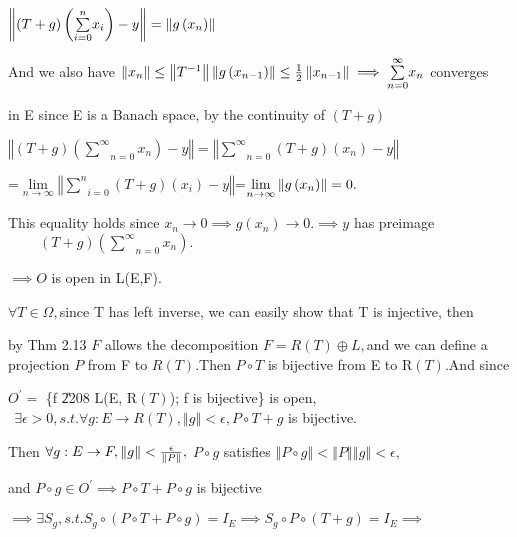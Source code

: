 \documentclass{article}
\begin{document}
\bigskip $\left\Vert \left( T+g\right) \left( \underset{i=0}{\overset{n}{%
\sum }}x_{i}\right) -y\right\Vert =\left\Vert g\left( x_{n}\right)
\right\Vert $

And we also have $\left\Vert x_{n}\right\Vert \leq \left\Vert
T^{-1}\right\Vert \left\Vert g\left( x_{n-1}\right) \right\Vert \leq \frac{1%
}{2}\left\Vert x_{n-1}\right\Vert \implies \underset{n=0}{\overset{\infty }{%
\sum }}x_{n}$ converges 

in E since E is a Banach space, by the continuity of $\left( T+g\right) $

$\left\Vert \left( T+g\right) \left( \underset{n=0}{\overset{\infty }{\sum }}%
x_{n}\right) -y\right\Vert =\left\Vert \underset{n=0}{\overset{\infty }{\sum 
}}\left( T+g\right) \left( x_{n}\right) -y\right\Vert $

=$\underset{n\rightarrow \infty }{\lim }\left\Vert \underset{i=0}{\overset{n}%
{\sum }}\left( T+g\right) \left( x_{i}\right) -y\right\Vert $=$\underset{%
n\rightarrow \infty }{\lim }\left\Vert g\left( x_{n}\right) \right\Vert =0.$

This equality holds since $x_{n}\rightarrow 0\implies g\left( x_{n}\right)
\rightarrow 0.\implies y$ has preimage $\ \qquad \left( T+g\right) \left( 
\underset{n=0}{\overset{\infty }{\sum }}x_{n}\right) .$ 

$\implies O$ is open in L(E,F). 

$\forall T\in \Omega ,$since T has left inverse, we can easily show that T
is injective, then 

by Thm 2.13 $F$ allows the decomposition $F=R\left( T\right) \oplus L,$and
we can define a projection $P$ from F to $R\left( T\right) .$Then $P\circ T$
is bijective from E to R$\left( T\right) .$And since

$O^{\prime }=$ \{f \U{2208} L(E, R$\left( T\right) $); f is bijective\} is
open, $\ \ \exists \epsilon >0,s.t.\forall g:E\rightarrow R\left( T\right)
,\left\Vert g\right\Vert <\epsilon ,P\circ T+g$ is bijective.

Then $\forall g:E\rightarrow F,\left\Vert g\right\Vert <\frac{\epsilon }{%
\left\Vert P\right\Vert },$ $P\circ g$ satisfies $\left\Vert P\circ
g\right\Vert <\left\Vert P\right\Vert \left\Vert g\right\Vert <\epsilon ,$

and $P\circ g\in O^{\prime }\implies P\circ T+P\circ g$ is bijective

$\implies \exists S_{g},s.t.S_{g}\circ \left( P\circ T+P\circ g\right)
=I_{E}\implies S_{g}\circ P\circ \left( T+g\right) =I_{E}\implies $
\end{document}

